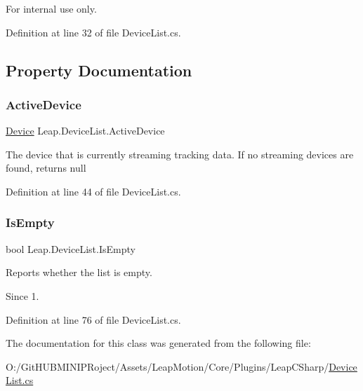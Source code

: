 For internal use only. 



Definition at line 32 of file Device\+List.\+cs.



\subsection{Property Documentation}
\mbox{\label{class_leap_1_1_device_list_aaef45b2e7bc5a396c058edf91c02897e}} 
\subsubsection{\texorpdfstring{ActiveDevice}{ActiveDevice}}
{\footnotesize\ttfamily \mbox{\hyperlink{class_leap_1_1_device}{Device}} Leap.\+Device\+List.\+Active\+Device\hspace{0.3cm}{\ttfamily [get]}}



The device that is currently streaming tracking data. If no streaming devices are found, returns null 



Definition at line 44 of file Device\+List.\+cs.

\mbox{\label{class_leap_1_1_device_list_a426d3900c84f918c90e38cb514a53ed4}} 
\subsubsection{\texorpdfstring{IsEmpty}{IsEmpty}}
{\footnotesize\ttfamily bool Leap.\+Device\+List.\+Is\+Empty\hspace{0.3cm}{\ttfamily [get]}}



Reports whether the list is empty. 

\begin{DoxySince}{Since}
1. 
\end{DoxySince}


Definition at line 76 of file Device\+List.\+cs.



The documentation for this class was generated from the following file\+:\begin{DoxyCompactItemize}
\item 
O\+:/\+Git\+H\+U\+B\+M\+I\+N\+I\+P\+Roject/\+Assets/\+Leap\+Motion/\+Core/\+Plugins/\+Leap\+C\+Sharp/\mbox{\hyperlink{_device_list_8cs}{Device\+List.\+cs}}\end{DoxyCompactItemize}
